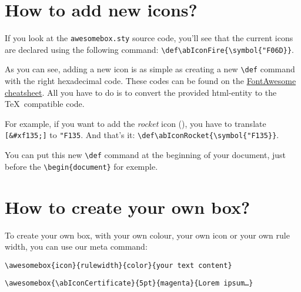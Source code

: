 \documentclass[a4paper,12pt]{article}
\def\abIconRocket{\symbol{"F135}}
\newcommand\hrefcolor[2]{\textcolor{magenta}{\href{#1}{#2}}}
\begin{document}

\section{How to add new icons?}
\label{sec:new-icons}

If you look at the \texttt{awesomebox.sty} source code, you'll see that
the current icons are declared using the following command:
\verb!\def\abIconFire{\symbol{"F06D}}!.

As you can see, adding a new icon is as simple as creating a new
\verb!\def! command with the right hexadecimal code. These codes can be
found on the \hrefcolor{http://fontawesome.io/cheatsheet/}{FontAwesome
  cheatsheet}. All you have to do is to convert the provided html-entity
to the \TeX\ compatible code.

For example, if you want to add the \emph{rocket} icon
({\ABFamily\abIconRocket}), you have to translate \verb![&#xf135;]! to
\texttt{"F135}. And that's it:
\verb!\def\abIconRocket{\symbol{"F135}}!.

You can put this new \verb!\def! command at the beginning of your
document, just before the \verb!\begin{document}! for exemple.

\section{How to create your own box?}

To create your own box, with your own colour, your own icon or your own
rule width, you can use our meta command:

\begin{center}
\verb!\awesomebox{icon}{rulewidth}{color}{your text content}!
\end{center}

\vspace{5mm}

\begin{center}
\verb!\awesomebox{\abIconCertificate}{5pt}{magenta}{Lorem ipsum…}!
\end{center}
\vspace{-5mm}
\end{document}
